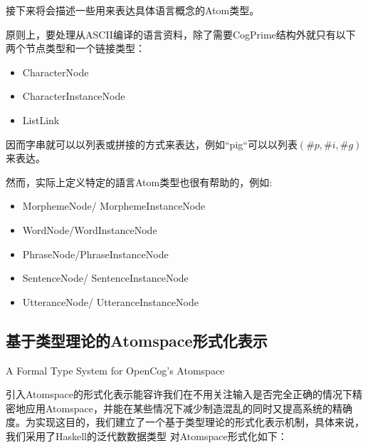 接下来将会描述一些用来表达具体语言概念的Atom类型。

原则上，要处理从ASCII编译的语言资料，除了需要CogPrime结构外就只有以下两个节点类型和一个链接类型：

\begin{itemize}
\item CharacterNode
\item CharacterInstanceNode
\item ListLink
\end{itemize}

\noindent 因而字串就可以以列表或拼接的方式来表达，例如“pig“可以以列表$(\#p, \#i, \#g)$来表达。

然而，实际上定义特定的語言Atom类型也很有帮助的，例如:

\begin{itemize}
\item	MorphemeNode/ MorphemeInstanceNode
\item		WordNode/WordInstanceNode
\item		PhraseNode/PhraseInstanceNode
\item		SentenceNode/ SentenceInstanceNode
\item		UtteranceNode/ UtteranceInstanceNode
\end{itemize}





\subsection{基于类型理论的Atomspace形式化表示}{A Formal Type System for OpenCog’s Atomspace}

引入Atomspace的形式化表示能容许我们在不用关注输入是否完全正确的情况下精密地应用Atomspace，并能在某些情况下减少制造混乱的同时又提高系统的精确度。为实现这目的，我们建立了一个基于类型理论的形式化表示机制，具体来说，我们采用了Haskell的泛代数数据类型 \cite{Haskell2014}对Atomspace形式化如下：

